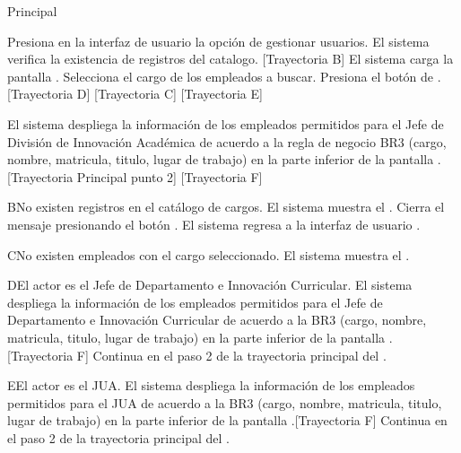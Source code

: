\begin{UCtrayectoria}{Principal}
    
    \UCpaso[\UCactor] Presiona en la interfaz de usuario  la opción de gestionar usuarios. 
    \UCpaso  El sistema verifica la existencia de registros del catalogo. [Trayectoria B] 
    \UCpaso El sistema carga la pantalla  .
    \UCpaso[\UCactor] Selecciona el cargo de los empleados a buscar. 
    \UCpaso[\UCactor]  Presiona el botón de . [Trayectoria D] [Trayectoria C] [Trayectoria E]
    
    \UCpaso El sistema despliega la información de los empleados permitidos para el Jefe de División de Innovación Académica de acuerdo a la regla de negocio BR3 (cargo, nombre, matricula, titulo, lugar de trabajo) en la parte inferior de la pantalla . [Trayectoria Principal punto 2] [Trayectoria F]
\end{UCtrayectoria}

\begin{UCtrayectoriaA}{B}{No existen registros en el catálogo de cargos.}
    \UCpaso     El sistema muestra el .
    \UCpaso[\UCactor] Cierra el mensaje presionando el botón .
    \UCpaso El sistema regresa a la interfaz de usuario .
\end{UCtrayectoriaA}

\begin{UCtrayectoriaA}{C}{No existen  empleados con el cargo seleccionado.}
    \UCpaso     El sistema muestra el .
\end{UCtrayectoriaA}

\begin{UCtrayectoriaA}{D}{El actor es el Jefe de Departamento e Innovación Curricular.}
 \UCpaso El sistema despliega la información  de los empleados permitidos para el Jefe de Departamento e Innovación Curricular de acuerdo a la BR3 (cargo, nombre, matricula, titulo, lugar de trabajo) en la parte inferior de la pantalla . [Trayectoria F]
  \UCpaso Continua en el paso 2 de la trayectoria principal del .
\end{UCtrayectoriaA}

\begin{UCtrayectoriaA}{E}{El actor es el JUA.}
 \UCpaso El sistema despliega la información  de los empleados permitidos para el JUA de acuerdo a la BR3 (cargo, nombre, matricula, titulo, lugar de trabajo) en la parte inferior de la pantalla .[Trayectoria F]
 \UCpaso Continua en el paso 2 de la trayectoria principal del .
\end{UCtrayectoriaA}

